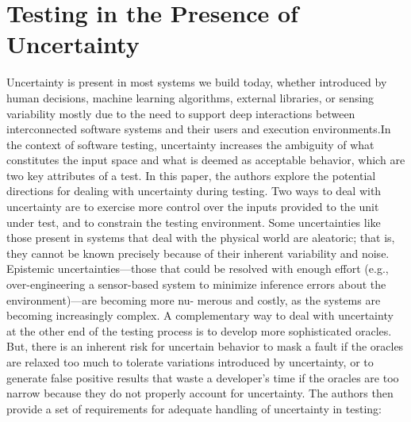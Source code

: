 \section{Testing in the Presence of Uncertainty \cite{Elbaum2014}}
Uncertainty is present in most systems we build today, whether introduced by human decisions, machine learning algorithms, external libraries, or sensing variability mostly due to the need to support deep interactions between interconnected software systems and their users and execution environments.In the context of software testing, uncertainty increases the ambiguity of what constitutes the input space and what is deemed as acceptable behavior, which are two key attributes of a test. In this paper, the authors explore the potential directions for dealing with uncertainty during testing.
Two ways to deal with uncertainty are to exercise more control over the inputs provided to the unit under test, and to constrain the testing environment. Some uncertainties like those present in systems that deal with the physical world are aleatoric; that is, they cannot be known precisely because of their inherent variability and noise. Epistemic uncertainties—those that could be resolved with enough effort (e.g., over-engineering a sensor-based system to minimize inference errors about the environment)—are becoming more nu- merous and costly, as the systems are becoming increasingly complex. A complementary way to deal with uncertainty at the other end of the testing process is to develop more sophisticated oracles. But, there is an inherent risk for uncertain behavior to mask a fault if the oracles are relaxed too much to tolerate variations introduced by uncertainty, or to generate false positive results that waste a developer’s time if the oracles are too narrow because they do not properly account for uncertainty. The authors then provide a set of requirements for adequate handling of uncertainty in testing:
